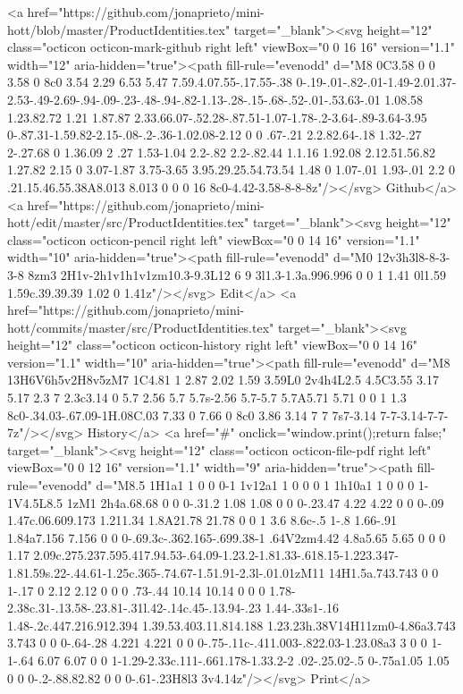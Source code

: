       <a href="https://github.com/jonaprieto/mini-hott/blob/master/ProductIdentities.tex" target="_blank"><svg height="12" class="octicon octicon-mark-github right left" viewBox="0 0 16 16" version="1.1" width="12" aria-hidden="true"><path fill-rule="evenodd" d="M8 0C3.58 0 0 3.58 0 8c0 3.54 2.29 6.53 5.47 7.59.4.07.55-.17.55-.38 0-.19-.01-.82-.01-1.49-2.01.37-2.53-.49-2.69-.94-.09-.23-.48-.94-.82-1.13-.28-.15-.68-.52-.01-.53.63-.01 1.08.58 1.23.82.72 1.21 1.87.87 2.33.66.07-.52.28-.87.51-1.07-1.78-.2-3.64-.89-3.64-3.95 0-.87.31-1.59.82-2.15-.08-.2-.36-1.02.08-2.12 0 0 .67-.21 2.2.82.64-.18 1.32-.27 2-.27.68 0 1.36.09 2 .27 1.53-1.04 2.2-.82 2.2-.82.44 1.1.16 1.92.08 2.12.51.56.82 1.27.82 2.15 0 3.07-1.87 3.75-3.65 3.95.29.25.54.73.54 1.48 0 1.07-.01 1.93-.01 2.2 0 .21.15.46.55.38A8.013 8.013 0 0 0 16 8c0-4.42-3.58-8-8-8z"/></svg> Github</a>
      <a href="https://github.com/jonaprieto/mini-hott/edit/master/src/ProductIdentities.tex" target="_blank"><svg height="12" class="octicon octicon-pencil right left" viewBox="0 0 14 16" version="1.1" width="10" aria-hidden="true"><path fill-rule="evenodd" d="M0 12v3h3l8-8-3-3-8 8zm3 2H1v-2h1v1h1v1zm10.3-9.3L12 6 9 3l1.3-1.3a.996.996 0 0 1 1.41 0l1.59 1.59c.39.39.39 1.02 0 1.41z"/></svg> Edit</a>
      <a href="https://github.com/jonaprieto/mini-hott/commits/master/src/ProductIdentities.tex" target="_blank"><svg height="12" class="octicon octicon-history right left" viewBox="0 0 14 16" version="1.1" width="10" aria-hidden="true"><path fill-rule="evenodd" d="M8 13H6V6h5v2H8v5zM7 1C4.81 1 2.87 2.02 1.59 3.59L0 2v4h4L2.5 4.5C3.55 3.17 5.17 2.3 7 2.3c3.14 0 5.7 2.56 5.7 5.7s-2.56 5.7-5.7 5.7A5.71 5.71 0 0 1 1.3 8c0-.34.03-.67.09-1H.08C.03 7.33 0 7.66 0 8c0 3.86 3.14 7 7 7s7-3.14 7-7-3.14-7-7-7z"/></svg> History</a>
      <a  href="#" onclick="window.print();return false;" target="_blank"><svg height="12" class="octicon octicon-file-pdf right left" viewBox="0 0 12 16" version="1.1" width="9" aria-hidden="true"><path fill-rule="evenodd" d="M8.5 1H1a1 1 0 0 0-1 1v12a1 1 0 0 0 1 1h10a1 1 0 0 0 1-1V4.5L8.5 1zM1 2h4a.68.68 0 0 0-.31.2 1.08 1.08 0 0 0-.23.47 4.22 4.22 0 0 0-.09 1.47c.06.609.173 1.211.34 1.8A21.78 21.78 0 0 1 3.6 8.6c-.5 1-.8 1.66-.91 1.84a7.156 7.156 0 0 0-.69.3c-.362.165-.699.38-1 .64V2zm4.42 4.8a5.65 5.65 0 0 0 1.17 2.09c.275.237.595.417.94.53-.64.09-1.23.2-1.81.33-.618.15-1.223.347-1.81.59s.22-.44.61-1.25c.365-.74.67-1.51.91-2.3l-.01.01zM11 14H1.5a.743.743 0 0 1-.17 0 2.12 2.12 0 0 0 .73-.44 10.14 10.14 0 0 0 1.78-2.38c.31-.13.58-.23.81-.31l.42-.14c.45-.13.94-.23 1.44-.33s1-.16 1.48-.2c.447.216.912.394 1.39.53.403.11.814.188 1.23.23h.38V14H11zm0-4.86a3.743 3.743 0 0 0-.64-.28 4.221 4.221 0 0 0-.75-.11c-.411.003-.822.03-1.23.08a3 3 0 0 1-1-.64 6.07 6.07 0 0 1-1.29-2.33c.111-.661.178-1.33.2-2 .02-.25.02-.5 0-.75a1.05 1.05 0 0 0-.2-.88.82.82 0 0 0-.61-.23H8l3 3v4.14z"/></svg> Print</a>
